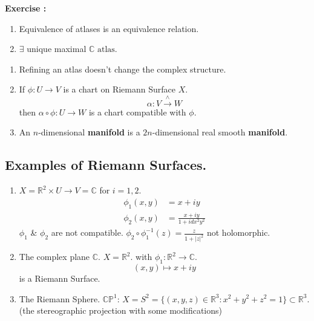 \documentclass{article}
\begin{document}
\textbf{Exercise :}
\begin{enumerate}
    \item Equivalence of atlases is an equivalence relation.
    \item $\exists$ unique maximal $\mathbb{C} \text{ atlas}$.
\end{enumerate}

\begin{remark}
    \begin{enumerate}[\upshape (i)]
        \item Refining an atlas doesn't change the complex structure.
        \item If $\phi : U \to V$ is a chart on Riemann Surface $X$.
        \[
        \alpha : V \xrightarrow{\wedge} W
        \]
        then $\alpha \circ \phi : U \to W$ is a chart compatible with $\phi$.
        \item An $n$-dimensional \textbf{manifold} is a $2n$-dimensional real smooth \textbf{manifold}.
    \end{enumerate}
\end{remark}

\subsection{Examples of Riemann Surfaces.}

\begin{example}
\begin{enumerate}
    The first example is a \textbf{Non-Examples:} 
    \item $X = \mathbb{R}^2 \times U \to V = \mathbb{C}$ for $i=1, 2$.
    \begin{align*}
        \phi_1 (x, y) &= x + iy \\
        \phi_2 (x, y) &= \frac{x+iy}{1+i dx^2 y^2}
    \end{align*}
    $\phi_1$ \& $\phi_2$ are not compatible.
    $\phi_2 \circ \phi_1^{-1} (z) = \frac{z}{1+|z|^2}$ not holomorphic.
    \item The complex plane $\mathbb{C}$.
    $X = \mathbb{R}^2$. with $\phi_1 : \mathbb{R}^2 \to \mathbb{C}$.
    \[
    (x, y) \mapsto x+iy
    \]
    is a Riemann Surface.
    \item The Riemann Sphere. $\mathbb{CP}^1$:
    $X = S^2 = \{ (x, y, z) \in \mathbb{R}^3 : x^2 + y^2 + z^2 = 1 \} \subset \mathbb{R}^3$.
    (the stereographic projection with some modifications)
\end{enumerate}
\end{example}
\end{document}
